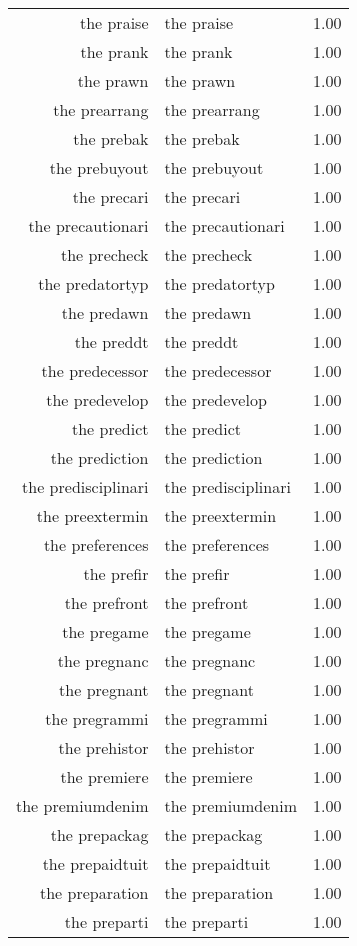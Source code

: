 \begin{table}[ht]
\begin{tabular}{rlr}
  the praise & the praise & 1.00 \\ 
  the prank & the prank & 1.00 \\ 
  the prawn & the prawn & 1.00 \\ 
  the prearrang & the prearrang & 1.00 \\ 
  the prebak & the prebak & 1.00 \\ 
  the prebuyout & the prebuyout & 1.00 \\ 
  the precari & the precari & 1.00 \\ 
  the precautionari & the precautionari & 1.00 \\ 
  the precheck & the precheck & 1.00 \\ 
  the predatortyp & the predatortyp & 1.00 \\ 
  the predawn & the predawn & 1.00 \\ 
  the preddt & the preddt & 1.00 \\ 
  the predecessor & the predecessor & 1.00 \\ 
  the predevelop & the predevelop & 1.00 \\ 
  the predict & the predict & 1.00 \\ 
  the prediction & the prediction & 1.00 \\ 
  the predisciplinari & the predisciplinari & 1.00 \\ 
  the preextermin & the preextermin & 1.00 \\ 
  the preferences & the preferences & 1.00 \\ 
  the prefir & the prefir & 1.00 \\ 
  the prefront & the prefront & 1.00 \\ 
  the pregame & the pregame & 1.00 \\ 
  the pregnanc & the pregnanc & 1.00 \\ 
  the pregnant & the pregnant & 1.00 \\ 
  the pregrammi & the pregrammi & 1.00 \\ 
  the prehistor & the prehistor & 1.00 \\ 
  the premiere & the premiere & 1.00 \\ 
  the premiumdenim & the premiumdenim & 1.00 \\ 
  the prepackag & the prepackag & 1.00 \\ 
  the prepaidtuit & the prepaidtuit & 1.00 \\ 
  the preparation & the preparation & 1.00 \\ 
  the preparti & the preparti & 1.00 \\ 

\end{tabular}
\end{table}
